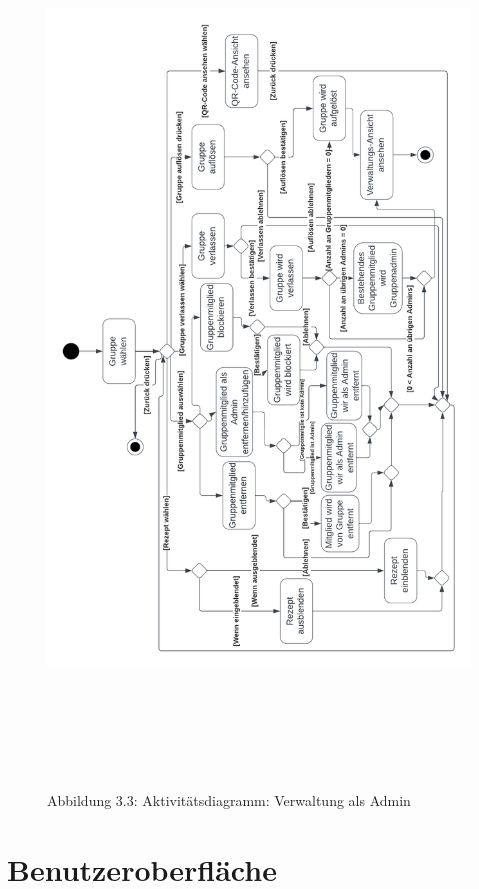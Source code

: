 \documentclass[parskip=full]{scrartcl}
\begin{document}
\begin{figure}[!htp]
    \centering
    \begin{adjustbox}{right=150mm}
        \includegraphics[height=230mm]{images/section3/ActivityDiagramGroupSettings.png}
    \end{adjustbox}
    Abbildung 3.3: Aktivitätsdiagramm: Verwaltung als Admin
    \label{fig:A33}
\end{figure}
\newpage

\section{Benutzeroberfläche}
\setcounter{secnumdepth}{6}
\renewcommand{\theparagraph}{$\langle$UI\arabic{paragraph}$\rangle$}
\end{document}
